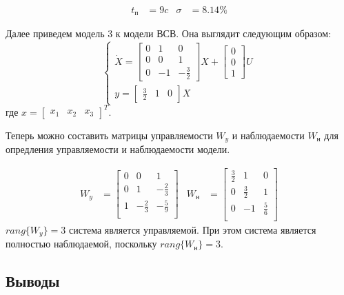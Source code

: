\documentclass[a4paper, 12pt]{article}
\begin{document}
\begin{align*}
t_\text{п} & = 9 c & \sigma & = 8.14\%
\end{align*} \par
Далее приведем модель 3 к модели ВСВ. Она выглядит следующим образом:
\begin{equation}
\begin{cases}
\dot{X} = \begin{bmatrix}
0 & 1 & 0 \\
0 & 0 & 1 \\
0 & -1 & -\frac{3}{2}
\end{bmatrix}X + \begin{bmatrix}
0 \\ 0 \\ 1
\end{bmatrix}U \\
y = \begin{bmatrix}\frac{3}{2} & 1 & 0\end{bmatrix} X
\end{cases}
\end{equation}
где $x = \begin{bmatrix} x_1 & x_2 & x_3 \end{bmatrix}^T$.
\newpage
\par
Теперь можно составить матрицы управляемости $W_y$ и наблюдаемости $W_\text{н}$ для опредления управляемости и наблюдаемости модели.

\begin{align*}
W_y & = \begin{bmatrix}
0 & 0 & 1 \\
0 & 1 & -\frac{2}{3} \\
1 & -\frac{2}{3} & -\frac{5}{9} \\
\end{bmatrix} & 
W_\text{н} & = \begin{bmatrix}
\frac{3}{2} & 1 & 0 \\
0 & \frac{3}{2} & 1 \\
0 & -1 & \frac{5}{6} \\
\end{bmatrix}
\end{align*}
 $rang\{W_y\} = 3$ система является управляемой. При этом система является полностью наблюдаемой, поскольку $rang\{W_\text{н}\} = 3$.

\newpage
\begin{center}
	\section*{Выводы}
\end{center}
\end{document}
